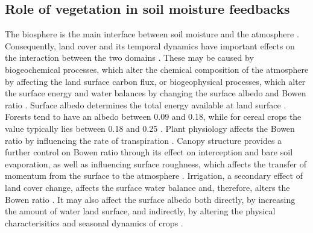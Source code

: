 \documentclass{icldt}\usepackage[]{graphicx}\usepackage[]{color}
\begin{document}
\subsection{Role of vegetation in soil moisture feedbacks}
The biosphere is the main interface between soil moisture and the atmosphere \citep{Lawrence2007a,Dirmeyer2006a}. Consequently, land cover and its temporal dynamics have important effects on the interaction between the two domains \citep{Sellers1997,Pielke2002,Feddema2005}. These may be caused by biogeochemical processes, which alter the chemical composition of the atmosphere by affecting the land surface carbon flux, or biogeophysical processes, which alter the surface energy and water balances by changing the surface albedo and Bowen ratio \citep{Feddema2005}. Surface albedo determines the total energy available at land surface \citep{Meehl1994,Pitman2003}. Forests tend to have an albedo between 0.09 and 0.18, while for cereal crops the value typically lies between 0.18 and 0.25 \citep{Barry2010}. Plant physiology affects the Bowen ratio by influencing the rate of transpiration \citep{Hillel1998}. Canopy structure provides a further control on Bowen ratio through its effect on interception and bare soil evaporation, as well as influencing surface roughness, which affects the transfer of momentum from the surface to the atmosphere \citep{Bounoua2002,Arneth2012}. Irrigation, a secondary effect of land cover change, affects the surface water balance and, therefore, alters the Bowen ratio \citep{Boucher2004}. It may also affect the surface albedo both directly, by increasing the amount of water land surface, and indirectly, by altering the physical characterisitics and seasonal dynamics of crops \citep{Seneviratne2010}. \\
\end{document}
